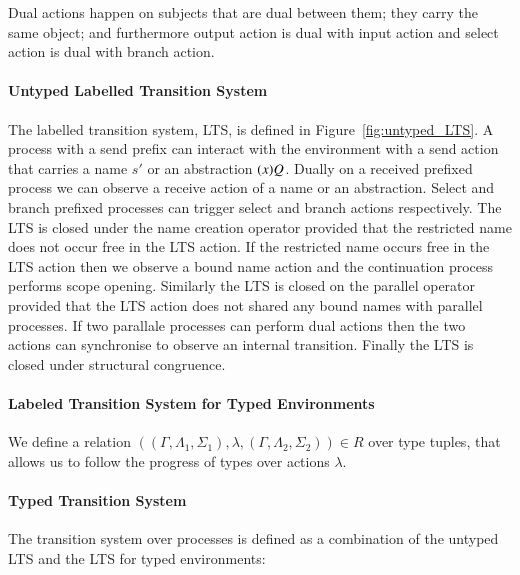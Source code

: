 Dual actions happen on subjects that are dual between them; they carry the same
object; and furthermore output action is dual with input action and 
select action is dual with branch action.

\paragraph{Untyped Labelled Transition System}



The labelled transition system, LTS, is defined in Figure~\ref{fig:untyped_LTS}.
A process with a send prefix can interact with the environment with a send
action that carries a name $s'$ or an abstraction $(x)Q$. Dually
on a received prefixed process we can observe a receive action of a name or
an abstraction. Select and branch prefixed processes can trigger select
and branch actions respectively. The LTS is closed under the name creation
operator provided that the restricted name does not occur free in the LTS action.
If the restricted name occurs free in the LTS action then we observe a bound name
action and the continuation process performs scope opening. Similarly the LTS 
is closed on the parallel operator provided that the LTS action does not shared
any bound names with parallel processes. If two parallale processes can perform
dual actions then the two actions can synchronise to observe an internal transition.
Finally the LTS is closed under structural congruence.


\paragraph{Labeled Transition System for Typed Environments}

We define a relation
$((\Gamma, \Lambda_1, \Sigma_1), \lambda, (\Gamma, \Lambda_2, \Sigma_2)) \in R$
over type tuples, that allows us to follow the progress of types over actions $\lambda$.




\paragraph{Typed Transition System}

The transition system over processes is defined as a combination
of the untyped LTS and the LTS for typed environments:

